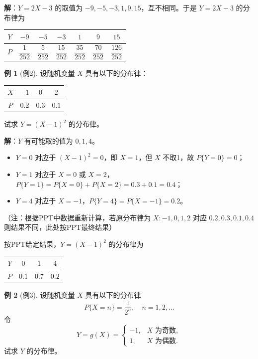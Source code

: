 \documentclass[11pt,a4paper]{report}
\theoremstyle{definition}
\newtheorem{example}{例}[chapter]
\begin{document}
\textbf{解}：$Y=2X-3$ 的取值为 $-9,-5,-3,1,9,15$，互不相同。于是 $Y=2X-3$ 的分布律为

\begin{table}[htbp]
\centering
\begin{tabular}{@{}ccccccc@{}}
\toprule
$Y$ & $-9$ & $-5$ & $-3$ & $1$ & $9$ & $15$ \\
\midrule
$P$ & $\dfrac{1}{252}$ & $\dfrac{5}{252}$ & $\dfrac{15}{252}$ & $\dfrac{35}{252}$ & $\dfrac{70}{252}$ & $\dfrac{126}{252}$ \\
\bottomrule
\end{tabular}
\end{table}

\begin{example}[例2]
设随机变量 $X$ 具有以下的分布律：
\begin{table}[htbp]
\centering
\begin{tabular}{@{}cccc@{}}
\toprule
$X$ & $-1$ & $0$ & $2$ \\
\midrule
$P$ & $0.2$ & $0.3$ & $0.1$ \\
\bottomrule
\end{tabular}
\end{table}
试求 $Y=(X-1)^2$ 的分布律。
\end{example}

\textbf{解}：$Y$ 有可能取的值为 $0,1,4$。
\begin{itemize}[leftmargin=2em]
    \item $Y=0$ 对应于 $(X-1)^2=0$，即 $X=1$，但 $X$ 不取1，故 $P\{Y=0\}=0$；
    \item $Y=1$ 对应于 $X=0$ 或 $X=2$，$P\{Y=1\}=P\{X=0\}+P\{X=2\}=0.3+0.1=0.4$；
    \item $Y=4$ 对应于 $X=-1$，$P\{Y=4\}=P\{X=-1\}=0.2$。
\end{itemize}
（注：根据PPT中数据重新计算，若原分布律为 $X:-1,0,1,2$ 对应 $0.2,0.3,0.1,0.4$ 则结果不同，此处按PPT最终结果）

按PPT给定结果，$Y=(X-1)^2$ 的分布律为

\begin{table}[htbp]
\centering
\begin{tabular}{@{}cccc@{}}
\toprule
$Y$ & $0$ & $1$ & $4$ \\
\midrule
$P$ & $0.1$ & $0.7$ & $0.2$ \\
\bottomrule
\end{tabular}
\end{table}

\begin{example}[例3]
设随机变量 $X$ 具有以下的分布律
\[
P\{X=n\} = \frac{1}{2^n}, \quad n=1,2,\dots
\]
令
\[
Y = g(X) = \begin{cases} -1, & X\text{ 为奇数}, \\ 1, & X\text{ 为偶数}. \end{cases}
\]
试求 $Y$ 的分布律。
\end{example}
\end{document}
